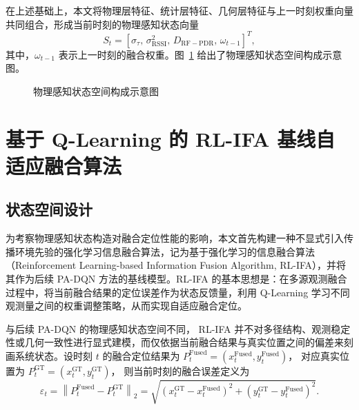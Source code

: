 在上述基础上，本文将物理层特征、统计层特征、几何层特征与上一时刻权重向量共同组合，形成当前时刻的物理感知状态向量
\begin{equation}
S_t=
\left[
\sigma_\tau,\,
\sigma^2_{\mathrm{RSSI}},\,
D_{\mathrm{RF-PDR}},\,
\omega_{t-1}
\right]^T,
\label{eq:3_11_state_vector}
\end{equation}
其中，\(\omega_{t-1}\) 表示上一时刻的融合权重。图~\ref{fig:ch3_physics_aware_state_space} 给出了物理感知状态空间构成示意图。

\begin{figure}[htbp]
    \centering
    \vspace{4.2cm}
    \caption{物理感知状态空间构成示意图}
    \label{fig:ch3_physics_aware_state_space}
\end{figure}

\section{基于 Q-Learning 的 RL-IFA 基线自适应融合算法}
\label{sec:3_3}

\subsection{状态空间设计}
\label{subsec:3_3_1}

为考察物理感知状态构造对融合定位性能的影响，本文首先构建一种不显式引入传播环境先验的强化学习信息融合算法，记为基于强化学习的信息融合算法（Reinforcement Learning-based Information Fusion Algorithm, RL-IFA），并将其作为后续 PA-DQN 方法的基线模型。RL-IFA 的基本思想是：在多源观测融合过程中，将当前融合结果的定位误差作为状态反馈量，利用 Q-Learning 学习不同观测量之间的权重调整策略，从而实现自适应融合定位。

与后续 PA-DQN 的物理感知状态空间不同， RL-IFA 并不对多径结构、观测稳定性或几何一致性进行显式建模，而仅依据当前融合结果与真实位置之间的偏差来刻画系统状态。设时刻 \(t\) 的融合定位结果为
\(
P_t^{\mathrm{Fused}}=(x_t^{\mathrm{Fused}},y_t^{\mathrm{Fused}})
\)，
对应真实位置为
\(
P_t^{\mathrm{GT}}=(x_t^{\mathrm{GT}},y_t^{\mathrm{GT}})
\)，
则当前时刻的融合误差定义为
\begin{equation}
\varepsilon_t
=
\left\|P_t^{\mathrm{Fused}}-P_t^{\mathrm{GT}}\right\|_2
=
\sqrt{
\left(x_t^{\mathrm{GT}}-x_t^{\mathrm{Fused}}\right)^2
+
\left(y_t^{\mathrm{GT}}-y_t^{\mathrm{Fused}}\right)^2
}.
\label{eq:3_12_rlifa_error}
\end{equation}

